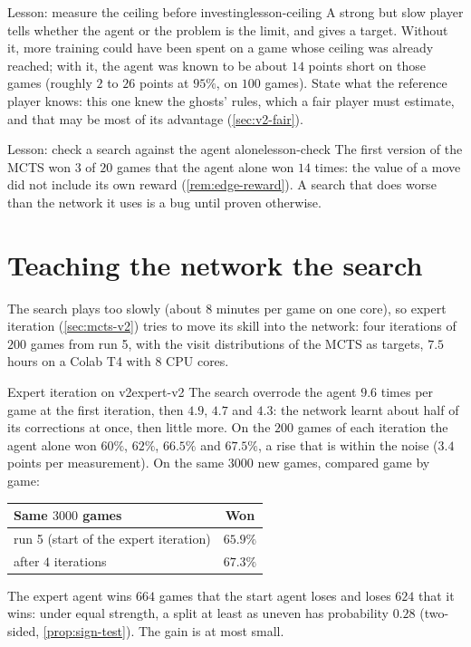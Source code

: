 \begin{remark}{Lesson: measure the ceiling before investing}{lesson-ceiling}
  A strong but slow player tells whether the agent or the problem is the
  limit, and gives a target. Without it, more training could have been
  spent on a game whose ceiling was already reached; with it, the agent
  was known to be about $14$ points short on those games (roughly $2$ to
  $26$ points at $95\%$, on $100$ games). State what the reference player
  knows: this one knew the ghosts' rules, which a fair player must
  estimate, and that may be most of its advantage (\cref{sec:v2-fair}).
\end{remark}

\begin{remark}{Lesson: check a search against the agent alone}{lesson-check}
  The first version of the MCTS won $3$ of $20$ games that the agent alone
  won $14$ times: the value of a move did not include its own reward
  (\cref{rem:edge-reward}). A search that does worse than the network it
  uses is a bug until proven otherwise.
\end{remark}

\section{Teaching the network the search}

The search plays too slowly (about $8$ minutes per game on one core), so
expert iteration (\cref{sec:mcts-v2}) tries to move its skill into the
network: four iterations of $200$ games from run 5, with the visit
distributions of the MCTS as targets, $7.5$ hours on a Colab T4 with $8$ CPU
cores.

\begin{pacman}{Expert iteration on v2}{expert-v2}
  The search overrode the agent $9.6$ times per game at the first
  iteration, then $4.9$, $4.7$ and $4.3$: the network learnt about half of
  its corrections at once, then little more. On the $200$ games of each
  iteration the agent alone won $60\%$, $62\%$, $66.5\%$ and $67.5\%$, a
  rise that is within the noise ($3.4$ points per measurement). On the same
  $3000$ new games, compared game by game:
  \begin{center}
    \begin{tabular}{@{}lc@{}}
      \toprule
      Same $3000$ games & Won \\
      \midrule
      run 5 (start of the expert iteration) & $65.9\%$ \\
      after $4$ iterations & $67.3\%$ \\
      \bottomrule
    \end{tabular}
  \end{center}
  The expert agent wins $664$ games that the start agent loses and loses
  $624$ that it wins: under equal strength, a split at least as uneven has
  probability $0.28$ (two-sided, \cref{prop:sign-test}). The gain is at
  most small.
\end{pacman}

